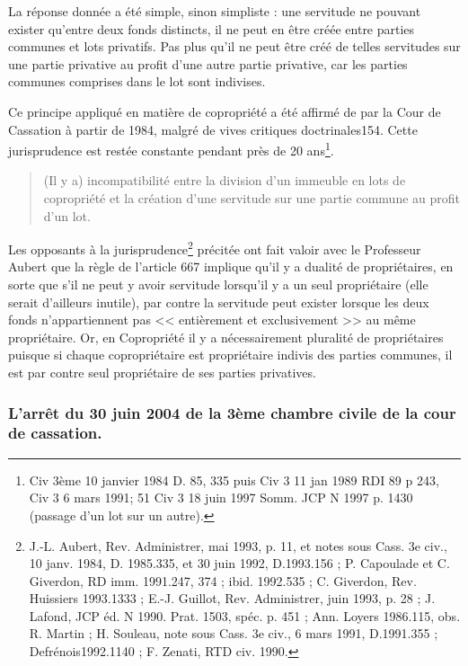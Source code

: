 			La réponse donnée a été simple, sinon simpliste : une servitude ne pouvant exister qu'entre deux fonds
			distincts, il ne peut en être créée entre parties communes et lots privatifs. Pas plus qu'il ne peut être créé
			de telles servitudes sur une partie privative au profit d'une autre partie privative, car les parties communes
			comprises dans le lot sont indivises.
			
			Ce principe appliqué en matière de copropriété a été affirmé de par la Cour de Cassation à partir de 1984,
			malgré de vives critiques doctrinales154. Cette jurisprudence est restée constante pendant près de 20 ans\footnote{Civ 3ème 10 janvier 1984 D. 85, 335 puis Civ 3\degre{} 11 jan 1989 RDI 89 p 243, Civ 3\degre{} 6 mars 1991; 51 Civ 3\degre{} 18 juin 1997 Somm. JCP N 1997  p. 1430 (passage d’un lot sur un autre).}.
			
			\begin{quote}
				(Il y a) incompatibilité entre la division d'un immeuble en lots de copropriété et la création d'une servitude			sur une partie commune au profit d'un lot.
			\end{quote}
			
			Les opposants à la jurisprudence\footnote{J.-L. Aubert, Rev. Administrer, mai 1993, p. 11, et notes sous Cass. 3e civ., 10 janv. 1984, D. 1985.335, et 30 juin 1992,		D.1993.156 ; P. Capoulade et C. Giverdon, RD imm. 1991.247, 374 ; ibid. 1992.535 ; C. Giverdon, Rev. Huissiers 1993.1333		; E.-J. Guillot, Rev. Administrer, juin 1993, p. 28 ; J. Lafond, JCP éd. N 1990. Prat. 1503, spéc. p. 451 ; Ann. Loyers 1986.115,		obs. R. Martin ; H. Souleau, note sous Cass. 3e civ., 6 mars 1991, D.1991.355 ; Defrénois1992.1140 ; F. Zenati, RTD civ.		1990.} précitée ont fait valoir avec le Professeur Aubert que la règle de l'article	667 implique qu'il y a dualité de propriétaires, en sorte que s'il ne peut y avoir servitude lorsqu'il y a un seul propriétaire (elle serait d'ailleurs inutile), par contre la servitude peut exister lorsque les deux fonds	n'appartiennent pas << entièrement et exclusivement >> au même propriétaire. Or, en Copropriété il y a	nécessairement pluralité de propriétaires puisque si chaque copropriétaire est propriétaire indivis des
			parties communes, il est par contre seul propriétaire de ses parties privatives.
		
		\subsubsection{L’arrêt du 30 juin 2004 de la 3ème chambre civile de la cour de cassation.}
		
